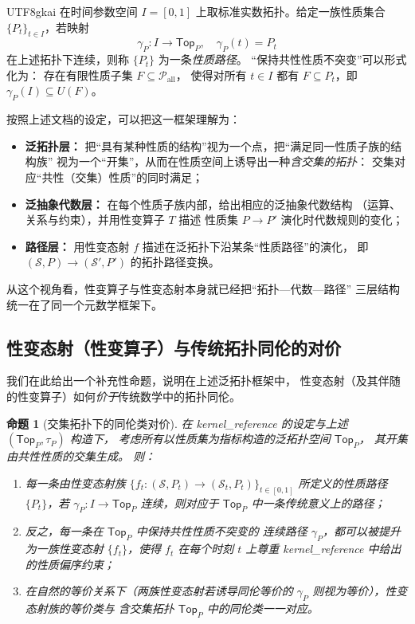 \documentclass[12pt]{article}
\newtheorem{proposition}{命题}[section]
\begin{document}
\begin{CJK*}{UTF8}{gkai}
在时间参数空间 $I=[0,1]$ 上取标准实数拓扑。给定一族性质集合
$\{P_t\}_{t\in I}$，若映射
\[
  \gamma_P:I\longrightarrow\mathsf{Top}_P,\quad
  \gamma_P(t)=P_t
\]
在上述拓扑下连续，则称 $\{P_t\}$ 为一条\emph{性质路径}。
“保持共性性质不突变”可以形式化为：
存在有限性质子集 $F\subseteq\mathcal{P}_{\mathrm{all}}$，
使得对所有 $t\in I$ 都有 $F\subseteq P_t$，即
$\gamma_P(I)\subseteq U(F)$。

按照上述文档的设定，可以把这一框架理解为：
\begin{itemize}
  \item \textbf{泛拓扑层：}
        把“具有某种性质的结构”视为一个点，把“满足同一性质子族的结构族”
        视为一个“开集”，从而在性质空间上诱导出一种\emph{含交集的拓扑}：
        交集对应“共性（交集）性质”的同时满足；
  \item \textbf{泛抽象代数层：}
        在每个性质子族内部，给出相应的泛抽象代数结构
        （运算、关系与约束），并用性变算子 $T$ 描述
        性质集 $P\to P'$ 演化时代数规则的变化；
  \item \textbf{路径层：}
        用性变态射 $f$ 描述在泛拓扑下沿某条“性质路径”的演化，
        即 $(\mathcal{S},P)\to(\mathcal{S}',P')$ 的拓扑路径变换。
\end{itemize}

从这个视角看，性变算子与性变态射本身就已经把“拓扑—代数—路径”
三层结构统一在了同一个元数学框架下。

\subsection{性变态射（性变算子）与传统拓扑同伦的对价}

我们在此给出一个补充性命题，说明在上述泛拓扑框架中，
性变态射（及其伴随的性变算子）如何\emph{价于}传统数学中的拓扑同伦。

\begin{proposition}[交集拓扑下的同伦类对价]
在 kernel\_reference 的设定与上述 $(\mathsf{Top}_P,\tau_P)$ 构造下，
考虑所有以性质集为指标构造的泛拓扑空间 $\mathsf{Top}_P$，
其开集由共性性质的交集生成。
则：
  \begin{enumerate}
    \item 每一条由性变态射族
          $\{f_t:(\mathcal{S},P_t)\to(\mathcal{S}_t,P_t)\}_{t\in[0,1]}$
          所定义的性质路径 $\{P_t\}$，若 $\gamma_P:I\to\mathsf{Top}_P$
          连续，则对应于 $\mathsf{Top}_P$ 中一条传统意义上的路径；
    \item 反之，每一条在 $\mathsf{Top}_P$ 中保持共性性质不突变的
          连续路径 $\gamma_P$，都可以被提升为一族性变态射
          $\{f_t\}$，使得 $f_t$ 在每个时刻 $t$ 上尊重
          kernel\_reference 中给出的性质偏序约束；
    \item 在自然的等价关系下（两族性变态射若诱导同伦等价的
          $\gamma_P$ 则视为等价），性变态射族的等价类与
          含交集拓扑 $\mathsf{Top}_P$ 中的同伦类一一对应。
  \end{enumerate}
\end{proposition}


\end{CJK*}
\end{document}
